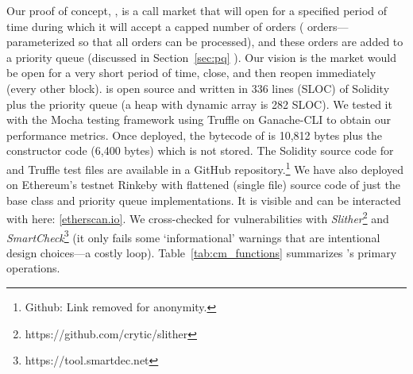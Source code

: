 Our proof of concept, \cm, is a call market that will open for a specified period of time during which it will accept a capped number of orders ( orders---parameterized so that all orders can be processed), and these orders are added to a priority queue (discussed in Section~\ref{sec:pq} ). Our vision is the market would be open for a very short period of time, close, and then reopen immediately (\eg every other block). \cm is open source and written in 336 lines (SLOC) of Solidity plus the priority queue (\eg a heap with dynamic array is 282 SLOC). We tested it with the Mocha testing framework using Truffle on Ganache-CLI to obtain our performance metrics. Once deployed, the bytecode of \cm is 10,812 bytes plus the constructor code (6,400 bytes) which is not stored. The Solidity source code for \cm and Truffle test files are available in a GitHub repository.\footnote{Github: Link removed for anonymity.} We have also deployed \cm on Ethereum's testnet Rinkeby with flattened (single file) source code of just the \cm base class and priority queue implementations. It is visible and can be interacted with here: \href{https://rinkeby.etherscan.io/address/0x0d91de29c531d074853a5cef7cf9dfeb9c6ec4e0}{[etherscan.io]}. We cross-checked for vulnerabilities with \textit{Slither}\footnote{https://github.com/crytic/slither} and \textit{SmartCheck}\footnote{https://tool.smartdec.net} (it only fails some `informational' warnings that are intentional design choices---\eg a costly loop). Table~\ref{tab:cm_functions} summarizes \cm's primary operations.





%
%


